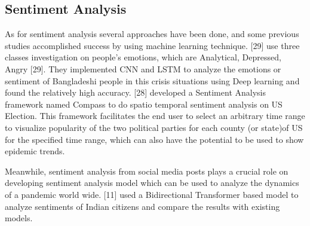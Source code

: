 \subsection{Sentiment Analysis}
As for sentiment analysis several approaches have been done, and some previous
studies accomplished success by using machine learning technique. [29] use
three classes investigation on people’s emotions, which are Analytical,
Depressed, Angry [29]. They implemented CNN and LSTM to analyze the emotions
or sentiment of Bangladeshi people in this crisis situations using Deep
learning and found the relatively high accuracy. [28] developed a Sentiment
Analysis framework named Compass to do spatio temporal sentiment analysis on
US Election. This framework facilitates the end user to select an arbitrary
time range to visualize popularity of the two political parties for each
county (or state)of US for the specified time range, which can also have the
potential to be used to show epidemic trends.

Meanwhile, sentiment analysis from social media posts plays a crucial role on
developing sentiment analysis model which can be used to analyze the dynamics
of a pandemic world wide. [11] used a Bidirectional Transformer based model
to analyze sentiments of Indian citizens and compare the results with
existing models.

